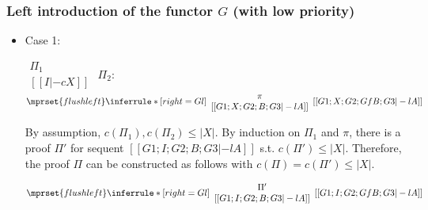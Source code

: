 \subsubsection{Left introduction of the functor $G$ (with low priority)}
\begin{itemize}
\item Case 1:
      \begin{center}
        \scriptsize
        \begin{math}
          \begin{array}{c}
            \Pi_1 \\
            {[[I |-c X]]}
          \end{array}
        \end{math}
        \qquad\qquad
        $\Pi_2$:
        \begin{math}
          $$\mprset{flushleft}
          \inferrule* [right={\tiny Gl}] {
            {
              \begin{array}{c}
                \pi \\
                {[[G1; X; G2; B; G3 |-l A]]}
              \end{array}
            }
          }{[[G1; X; G2; Gf B; G3 |-l A]]}
        \end{math}
      \end{center}
      By assumption, $c(\Pi_1),c(\Pi_2)\leq |X|$. By induction on $\Pi_1$
      and $\pi$, there is a proof $\Pi'$ for sequent
      $[[G1; I; G2; B; G3 |-l A]]$ s.t. $c(\Pi') \leq |X|$. Therefore, the
      proof $\Pi$ can be constructed as follows with
      $c(\Pi) = c(\Pi') \leq |X|$.
      \begin{center}
        \scriptsize
        \begin{math}
          $$\mprset{flushleft}
          \inferrule* [right={\tiny Gl}] {
            {
              \begin{array}{c}
                \Pi' \\
                {[[G1; I; G2; B; G3 |-l A]]}
              \end{array}
            }
          }{[[G1; I; G2; Gf B; G3 |-l A]]}
        \end{math}
      \end{center}


\end{itemize}
